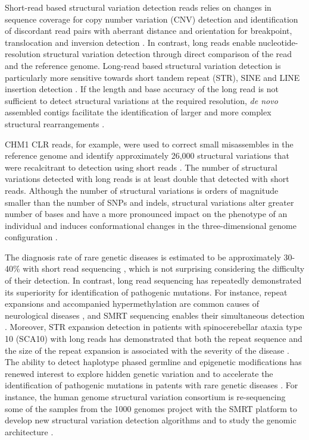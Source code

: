 Short-read based structural variation detection reads relies on changes in sequence coverage for copy number variation (CNV) detection \cite{Abyzov2011-xl} and identification of discordant read pairs with aberrant distance and orientation for breakpoint, translocation and inversion detection \cite{Alkan2011-dv}. In contrast, long reads enable nucleotide-resolution structural variation detection through direct comparison of the read and the reference genome. Long-read based structural variation detection is particularly more sensitive towards short tandem repeat (STR), SINE and LINE insertion detection \cite{Chaisson2015-zz, Sedlazeck2018-oh, Denti2022-ux}. If the length and base accuracy of the long read is not sufficient to detect structural variations at the required resolution, \textit{de novo} assembled contigs facilitate the identification of larger and more complex structural rearrangements \cite{Nattestad2016-og}.

CHM1 CLR reads, for example, were used to correct small misassembles in the reference genome and identify approximately 26,000 structural variations that were recalcitrant to detection using short reads \cite{Chaisson2015-zz}. The number of structural variations detected with long reads is at least double that detected with short reads. Although the number of structural variations is orders of magnitude smaller than the number of SNPs and indels, structural variations alter greater number of bases and have a more pronounced impact on the phenotype of an individual \cite{Weischenfeldt2013-tl} and induces conformational changes in the three-dimensional genome configuration \cite{Spielmann2018-fm}.

The diagnosis rate of rare genetic diseases is estimated to be approximately 30-40\% with short read sequencing \cite{Wright2023-et}, which is not surprising considering the difficulty of their detection. In contrast, long read sequencing has repeatedly demonstrated its superiority for identification of pathogenic mutations. For instance, repeat expansions and accompanied hypermethylation are common causes of neurological diseases \cite{Zhou2022-ci}, and SMRT sequencing enables their simultaneous detection \cite{Tse2021-or}. Moreover, STR expansion detection in patients with spinocerebellar ataxia type 10 (SCA10) with long reads has demonstrated that both the repeat sequence and the size of the repeat expansion is associated with the severity of the disease \cite{McFarland2015-qh}. The ability to detect haplotype phased germline and epigenetic modifications has renewed interest to explore hidden genetic variation and to accelerate the identification of pathogenic mutations in patents with rare genetic diseases \cite{Miller2021-lt}. For instance, the human genome structural variation consortium is re-sequencing some of the samples from the 1000 genomes project with the SMRT platform to develop new structural variation detection algorithms and to study the genomic architecture \cite{Ebert2021-zk}. 

